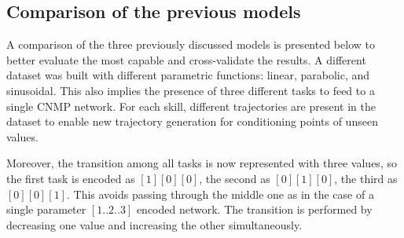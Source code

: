 \subsection{Comparison of the previous models}
A comparison of the three previously discussed models is presented below to better evaluate the most capable and cross-validate the results. 
A different dataset was built with different parametric functions: linear, parabolic, and sinusoidal. This also implies the presence of three different tasks to feed to a single CNMP network. For each skill, different trajectories are present in the dataset to enable new trajectory generation for conditioning points of unseen values. 

Moreover, the transition among all tasks is now represented with three values, so the first task is encoded as $[1][0][0]$, the second as $[0][1][0]$, the third as $[0][0][1]$. This avoids passing through the middle one as in the case of a single parameter $[1..2..3]$ encoded network. The transition is performed by decreasing one value and increasing the other simultaneously.


